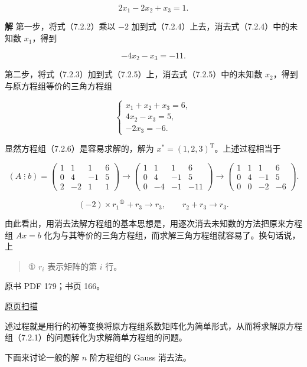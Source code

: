 \documentclass[
  10pt,
  fontset=fandol]{ctexart}
\begin{document}
\[2x_1-2x_2+x_3=1.\tag{7.2.4}\]

\textbf{解} 第一步，将式（7.2.2）乘以 \(-2\) 加到式（7.2.4）上去，消去式（7.2.4）中的未知数 \(x_1\)，得到

\[-4x_2-x_3=-11.\tag{7.2.5}\]

第二步，将式（7.2.3）加到式（7.2.5）上，消去式（7.2.5）中的未知数 \(x_2\)，得到与原方程组等价的三角方程组

\[
\begin{cases}
x_1+x_2+x_3=6,\\
4x_2-x_3=5,\\
-2x_3=-6.
\end{cases}
\tag{7.2.6}
\]

显然方程组（7.2.6）是容易求解的，解为 \(x^*=(1,2,3)^{\mathrm T}\)。上述过程相当于

\[
(A\mathbin{\vdots}b)=
\left(\begin{array}{rrr|r}1&1&1&6\\0&4&-1&5\\2&-2&1&1\end{array}\right)
\longrightarrow
\left(\begin{array}{rrr|r}1&1&1&6\\0&4&-1&5\\0&-4&-1&-11\end{array}\right)
\longrightarrow
\left(\begin{array}{rrr|r}1&1&1&6\\0&4&-1&5\\0&0&-2&-6\end{array}\right).
\]

\[(-2)\times r_1{}^{\text{①}}+r_3\to r_3,\qquad r_2+r_3\to r_3.\]

由此看出，用消去法解方程组的基本思想是，用逐次消去未知数的方法把原来方程组 \(Ax=b\) 化为与其等价的三角方程组，而求解三角方程组就容易了。换句话说，上

\begin{quote}
① \(r_i\) 表示矩阵的第 \(i\) 行。
\end{quote}

\clearpage

原书 PDF 179；书页 166。

\href{/Users/xiangjunfeng/Desktop/数值计算专用/numerical-analysis/book/source-images/pdf-179.jpeg}{原页扫描}

述过程就是用行的初等变换将原方程组系数矩阵化为简单形式，从而将求解原方程组（7.2.1）的问题转化为求解简单方程组的问题。

下面来讨论一般的解 \(n\) 阶方程组的 Gauss 消去法。
\end{document}
